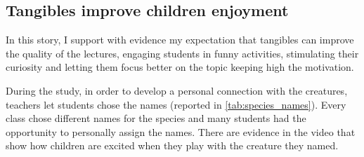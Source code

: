 \subsection{Tangibles improve children enjoyment}
In this story, I support with evidence my expectation that tangibles can improve the quality of the lectures, engaging students in funny activities, stimulating their curiosity and letting them focus better on the topic keeping high the motivation.

During the study, in order to develop a personal connection with the creatures, teachers let students chose the names (reported in \ref{tab:species_names}). Every class chose different names for the species and many students had the opportunity to personally assign the names. There are evidence in the video that show how children are excited when they play with the creature they named.

